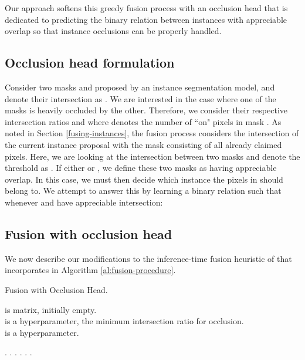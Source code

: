 \documentclass[10pt,twocolumn,letterpaper]{article}
\begin{document}
Our approach softens this greedy fusion process with an occlusion head that is dedicated to predicting the binary relation between instances with appreciable overlap so that instance occlusions can be properly handled.

\subsection{Occlusion head formulation}

Consider two masks  and  proposed by an instance segmentation model, and denote their intersection as . We are interested in the case where one of the masks is heavily occluded by the other. Therefore, we consider their respective intersection ratios  and  where  denotes the number of ``on" pixels in mask . As noted in Section \ref{fusing-instances}, the fusion process considers the intersection of the current instance proposal with the mask consisting of all already claimed pixels. Here, we are looking at the intersection between two masks and denote the threshold as . If either  or , we define these two masks as having appreciable overlap. In this case,  we must then decide which instance the pixels in  should belong to. We attempt to answer this by learning a binary relation   such that whenever  and  have appreciable intersection:

\vspace{-5mm}

\vspace{-5mm}

\subsection{Fusion with occlusion head}
\label{fusion-with_occlusion}
We now describe our modifications to the inference-time fusion heuristic of \cite{kirillov2018panoptic} that incorporates  in Algorithm \ref{al:fusion-procedure}.

\begin{algorithm}[!htp]
\caption{\small Fusion with Occlusion Head.}
 is  matrix, initially empty.\\
 is a hyperparameter, the minimum intersection ratio for occlusion. \\
 is a hyperparameter.

\label{al:fusion-procedure}
\begin{algorithmic}
{
{\small
{}
    \State  {}
    \For {} 
        .
        \State{}.
        \State{}.        
         
        \If{}
        \State{}.
        \State{}.
        \EndIf
        \EndIf
    \EndFor
    \If{}
         \Else
         .
    \EndIf
\EndFor
}
}
\end{algorithmic}

\end{algorithm}
\end{document}
